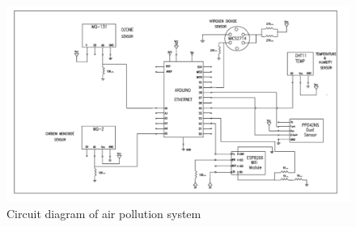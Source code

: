  \begin{figure}[h!]
  \begin{center}
  \includegraphics[scale=0.55]{./images/figure5.png}
  \end{center}
  \caption{Circuit diagram of air pollution system}
  \label{circuit}
\end{figure}


\hspace{1 cm}

